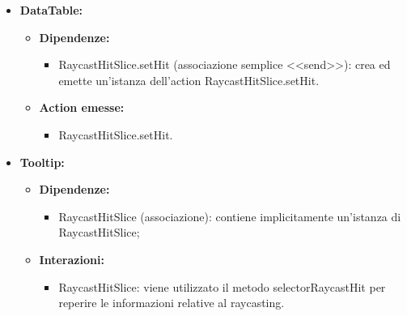 \begin{itemize}
      \item \textbf{DataTable:}
            \begin{itemize}
                  \item \textbf{Dipendenze:}
                        \begin{itemize}
                              \item RaycastHitSlice.setHit (associazione semplice <<send>>): crea ed
                                    emette un'istanza dell'action RaycastHitSlice.setHit.
                        \end{itemize}
                  \item \textbf{Action emesse:}
                        \begin{itemize}
                              \item RaycastHitSlice.setHit.
                        \end{itemize}
            \end{itemize}

      \item \textbf{Tooltip:}
            \begin{itemize}
                  \item \textbf{Dipendenze:}
                        \begin{itemize}
                              \item RaycastHitSlice (associazione): contiene implicitamente un'istanza di
                                    RaycastHitSlice;
                        \end{itemize}
                  \item \textbf{Interazioni:}
                        \begin{itemize}
                              \item RaycastHitSlice: viene utilizzato il metodo selectorRaycastHit per reperire le
                                    informazioni relative al raycasting.
                        \end{itemize}
            \end{itemize}


\end{itemize}
